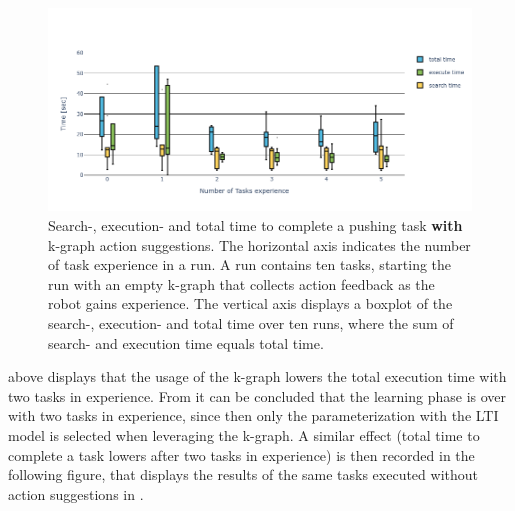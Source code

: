 \begin{figure}[H]
    \centering
    \includegraphics[width=\textwidth]{figures/results/random_push_time_k-graph}
    \caption{Search-, execution- and total time to complete a pushing task \textbf{with} \ac{k-graph} action suggestions. The horizontal axis indicates the number of task experience in a run. A run contains ten tasks, starting the run with an empty \ac{k-graph} that collects action feedback as the robot gains experience. The vertical axis displays a boxplot of the search-, execution- and total time over ten runs, where the sum of search- and execution time equals total time.}%
    \label{fig:random_push_time_k-graph}
\end{figure}

 above displays that the usage of the \ac{k-graph} lowers the total execution time with two tasks in experience. From  it can be concluded that the learning phase is over with two tasks in experience, since then only the parameterization with the \ac{LTI} model is selected when leveraging the \ac{k-graph}. A similar effect (total time to complete a task lowers after two tasks in experience) is then recorded in the following figure, that displays the results of the same tasks executed without action suggestions in .\bs

